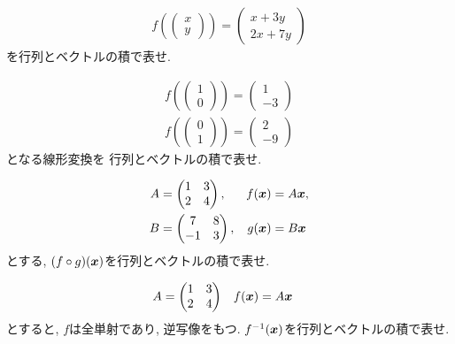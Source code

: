 \begin{quiz}
  \begin{align*}
    f(\begin{pmatrix}x\\y\end{pmatrix})
      =\begin{pmatrix}x+3y\\2x+7y\end{pmatrix}
  \end{align*}
  を行列とベクトルの積で表せ.
\end{quiz}
\begin{quiz}
  \begin{align*}
    f(\begin{pmatrix}1\\0\end{pmatrix})=\begin{pmatrix}1\\-3\end{pmatrix}\\
    f(\begin{pmatrix}0\\1\end{pmatrix})=\begin{pmatrix}2\\-9\end{pmatrix}
  \end{align*}
  となる線形変換を
  行列とベクトルの積で表せ.
\end{quiz}
\begin{quiz}
  \begin{align*}
    A&=\begin{pmatrix}1&3\\2&4\end{pmatrix},
    &f(\boldsymbol{x})&=A\boldsymbol{x},\\
    B&=\begin{pmatrix}7&8\\-1&3\end{pmatrix},
        &g(\boldsymbol{x})&=B\boldsymbol{x}
  \end{align*}
  とする,
  $(f\circ g)(\boldsymbol{x})$を行列とベクトルの積で表せ.
\end{quiz}

\begin{quiz}
  \begin{align*}
    A&=\begin{pmatrix}1&3\\2&4\end{pmatrix}&
    f(\boldsymbol{x})&=A\boldsymbol{x}
  \end{align*}
  とすると,
  $f$は全単射であり, 逆写像をもつ.  
  $f^{-1}(\boldsymbol{x})$を行列とベクトルの積で表せ.
\end{quiz}


